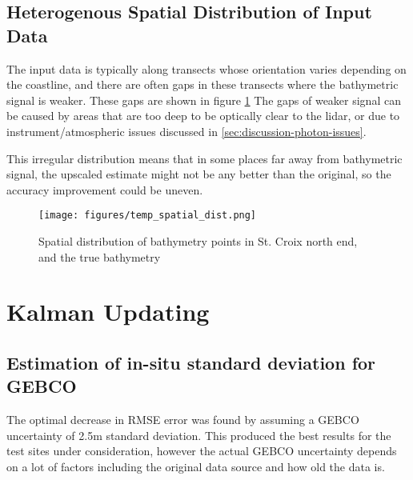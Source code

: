 \subsection{Heterogenous Spatial Distribution of Input Data}

The input data is typically along transects whose orientation varies depending on the coastline, and there are often gaps in these transects where the bathymetric signal is weaker. These gaps are shown in figure \ref{fig:distribution-of-bathy-points-in-space} The gaps of weaker signal can be caused by areas that are too deep to be optically clear to the lidar, or due to instrument/atmospheric issues discussed in \ref{sec:discussion-photon-issues}. 

This irregular distribution means that in some places far away from bathymetric signal, the upscaled estimate might not be any better than the original, so the accuracy improvement could be uneven. 

\begin{figure}[h!]
    \centering
    \texttt{[image: figures/temp\_spatial\_dist.png]}
    \caption{Spatial distribution of bathymetry points in St. Croix north end, and the true bathymetry}
    \label{fig:distribution-of-bathy-points-in-space}
\end{figure}



\section{Kalman Updating}


\subsection{Estimation of in-situ standard deviation for GEBCO}



The optimal decrease in RMSE error was found by assuming a GEBCO uncertainty of 2.5m standard deviation. This produced the best results for the test sites under consideration, however the actual GEBCO uncertainty depends on a lot of factors including the original data source and how old the data is. 

